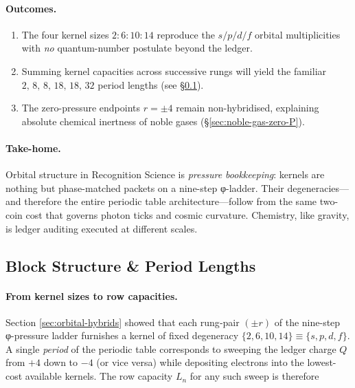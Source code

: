 \documentclass[11pt,oneside]{book}
\begin{document}
\paragraph*{Outcomes.}
\begin{enumerate}[label=(\roman*)]
\item The four kernel sizes \(2{:}6{:}10{:}14\) reproduce the
      \(s/p/d/f\) orbital multiplicities with \emph{no} quantum-number
      postulate beyond the ledger.
\item Summing kernel capacities across successive rungs will yield the
      familiar \(2,\,8,\,8,\,18,\,18,\,32\) period lengths
      (see §\ref{sec:block-structure}).
\item The zero-pressure endpoints \(r=\pm4\) remain non-hybridised,
      explaining absolute chemical inertness of noble gases
      (§\ref{sec:noble-gas-zero-P}).
\end{enumerate}

\paragraph*{Take-home.}
Orbital structure in Recognition Science is \emph{pressure bookkeeping}:
kernels are nothing but phase-matched packets on a nine-step φ-ladder.
Their degeneracies—and therefore the entire periodic table
architecture—follow from the same two-coin cost that governs photon
ticks and cosmic curvature.  Chemistry, like gravity, is ledger
auditing executed at different scales.

\subsection{Block Structure \& Period Lengths}
\label{sec:block-structure}

\paragraph*{From kernel sizes to row capacities.}
Section \ref{sec:orbital-hybrids} showed that each rung‐pair
\((\pm r)\) of the nine-step φ-pressure ladder furnishes a kernel of fixed
degeneracy
\(\{2,6,10,14\}\equiv\{s,p,d,f\}\).
A single \emph{period} of the periodic table corresponds to sweeping the
ledger charge \(Q\) from \(+4\) down to \(-4\) (or vice versa) while
depositing electrons into the lowest-cost available kernels.
The row capacity \(L_{n}\) for any such sweep is therefore
\end{document}

